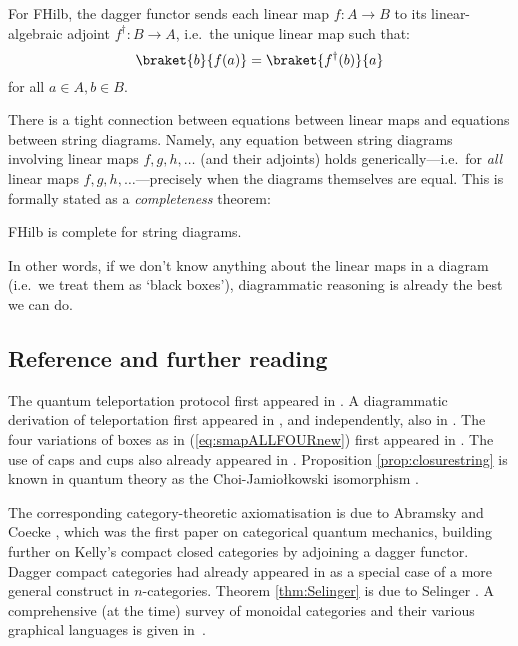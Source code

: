 \documentclass[12pt]{article}
\begin{document}
\begin{example}
For FHilb, the dagger functor sends each linear map $f : A \to B$ to its linear-algebraic adjoint $f^\dagger : B \to A$, i.e.~the unique linear map such that:
\[ 
\braket{b}{f(a)} = \braket{f^\dagger(b)}{a} 
\]
for all $a \in A, b\in B$.
\end{example}

There is a tight connection between equations between linear maps and equations between string diagrams. Namely, any equation between string diagrams involving linear maps $f, g, h, \ldots$ (and their adjoints) holds generically---i.e.~for {\em all} linear maps $f, g, h, \ldots$---precisely when the diagrams themselves are equal. This is formally stated as a \textit{completeness} theorem:

\begin{theorem}\label{thm:Selinger}
  FHilb is complete for string diagrams.
\end{theorem}

In other words, if we don't know anything about the linear maps in a diagram (i.e.~we treat them as `black boxes'), diagrammatic reasoning is already the best we can do.

\subsection{Reference and further reading}

The quantum teleportation protocol first appeared in \cite{tele}. A diagrammatic derivation of teleportation first appeared in \cite{LE1}, and independently, also in \cite{Kauffman}.  The four variations of boxes as in (\ref{eq:smapALLFOURnew}) first appeared in \cite{SelingerCPM}. The use of caps and cups also already appeared in \cite{Penrose}. Proposition \ref{prop:closurestring} is known in quantum theory as the Choi-Jamio\l{}kowski isomorphism \cite{jamiolkowski, choi}.

The corresponding category-theoretic axiomatisation is due to Abramsky and Coecke \cite{AC1}, which was the first paper on categorical quantum mechanics, building further on Kelly's compact closed categories \cite{Kelly} by adjoining a dagger functor. Dagger compact categories had already appeared in \cite{BaezDolan} as a  special case of a more general construct in $n$-categories. Theorem \ref{thm:Selinger} is due to Selinger \cite{Selingercompleteness}. A comprehensive (at the time) survey of monoidal categories and their various graphical languages is given in~\cite{SelingerSurvey}.
\end{document}
